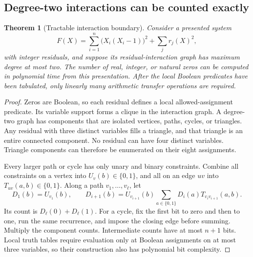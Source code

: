 \documentclass[11pt,letterpaper]{article}
\numberwithin{equation}{section}
\newtheorem{theorem}{Theorem}[section]
\theoremstyle{definition}
\theoremstyle{remark}
\newcommand{\Bit}{\{0,1\}}
\begin{document}
\subsection{Degree-two interactions can be counted exactly}
\begin{theorem}[Tractable interaction boundary]\label{pqc:ql:thm:degree2}
Consider a presented system
\[
 F(X)=\sum_{i=1}^n\bigl(X_i(X_i-1)\bigr)^2+\sum_j r_j(X)^2,
\]
with integer residuals, and suppose its residual-interaction graph has
maximum degree at most two. The number of real, integer, or natural zeros
can be computed in polynomial time from this presentation. After the
local Boolean predicates have been tabulated, only linearly many
arithmetic transfer operations are required.
\end{theorem}
\begin{proof}
Zeros are Boolean, so each residual defines a local allowed-assignment
predicate. Its variable support forms a clique in the interaction graph.
A degree-two graph has components that are isolated vertices, paths,
cycles, or triangles. Any residual with three distinct variables fills
a triangle, and that triangle is an entire connected component. No
residual can have four distinct variables. Triangle components can
therefore be enumerated on their eight assignments.

Every larger path or cycle has only unary and binary constraints. Combine
all constraints on a vertex into $U_v(b)\in\Bit$, and all on an edge
$uv$ into $T_{uv}(a,b)\in\Bit$. Along a path $v_1,\ldots,v_\ell$, let
\[
 D_1(b)=U_{v_1}(b),\qquad
 D_{i+1}(b)=U_{v_{i+1}}(b)\sum_{a\in\Bit}
 D_i(a)T_{v_iv_{i+1}}(a,b).
\]
Its count is $D_\ell(0)+D_\ell(1)$. For a cycle, fix the first bit to zero
and then to one, run the same recurrence, and impose the closing edge
before summing. Multiply the component counts. Intermediate counts have
at most $n+1$ bits. Local truth tables require evaluation only at Boolean
assignments on at most three variables, so their construction also has
polynomial bit complexity.
\end{proof}
\end{document}
